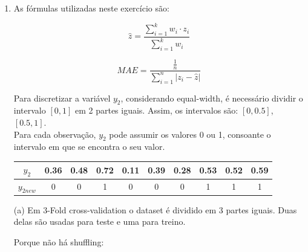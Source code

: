 \documentclass[a4paper,12pt]{article} %
\begin{document}
\begin{enumerate}
\item

As  fórmulas utilizadas neste exercício são:

\begin{equation*}
    \hat{z} = \frac{\sum_{i=1}^{k} w_i \cdot z_{i}}{\sum_{i=1}^{k} w_i}
\end{equation*}

\begin{equation*}
    MAE = \frac{\frac{1}{n}}{\sum_{i=1}^{n} |z_i - \hat{z}|}
\end{equation*}

Para discretizar a variável $y_2$, considerando equal-width, é necessário dividir o intervalo $[0,1]$ em 2 partes iguais. 
Assim, os intervalos são: $[0,0.5]$, $[0.5,1]$. \\

Para cada observação, $y_2$ pode assumir os valores 0 ou 1, consoante o intervalo em que se encontra o seu valor. \\

\begin{table}[H]
    \centering
    \begin{tabular}{c|ccccccccc}
    $y_2$     & 0.36 & 0.48 & 0.72 & 0.11 & 0.39 & 0.28 & 0.53 & 0.52 & 0.59 \\ \hline
    $y_{2 new}$ & 0    & 0    & 1    & 0    & 0    & 0    & 1    & 1    & 1   
    \end{tabular}
\end{table}

(a)
Em 3-Fold cross-validation o dataset é dividido em 3 partes iguais. Duas delas são usadas para teste e uma para treino.

Porque não há shuffling:


\end{enumerate}
\end{document}
